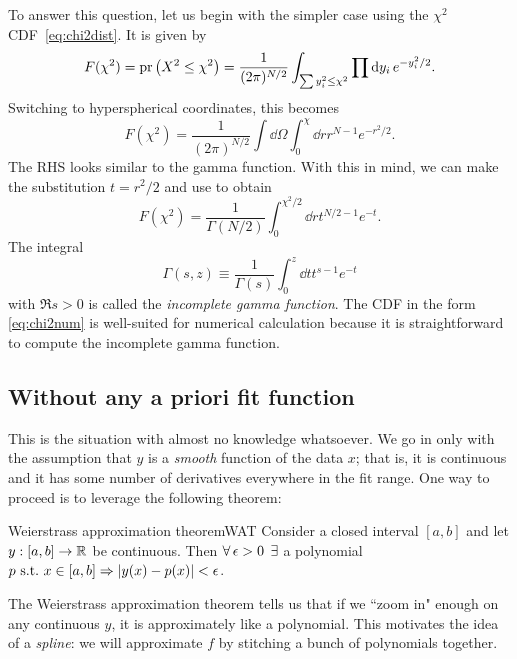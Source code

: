 To answer this question, let us begin with the simpler case using
the $\chi^2$ CDF~\eqref{eq:chi2dist}. It is given by
\begin{equation}
  F(\chi^2)=\pr{X^2\le\chi^2}
           =\frac{1}{(2\pi)^{N/2}}\int_{\sum y_i^2\le\chi^2}
            \prod\dd{y_i}e^{-y_i^2/2}.
\end{equation}
Switching to hyperspherical coordinates, this becomes
\begin{equation}
  F(\chi^2)=\frac{1}{(2\pi)^{N/2}}
              \int\dd{\Omega}\int_0^\chi\dd{r}r^{N-1}e^{-r^2/2}.
\end{equation}
The RHS looks similar to the gamma function. With this in mind,
we can make the substitution $t=r^2/2$ and use 
to obtain
\begin{equation}\label{eq:chi2num}
  F(\chi^2)=\frac{1}{\Gamma(N/2)}\int_0^{\chi^2/2}\dd{r}t^{N/2-1}e^{-t}.
\end{equation}
  The integral
  \begin{equation}
    \Gamma(s,z)\equiv\frac{1}{\Gamma(s)}\int_0^z\dd{t}t^{s-1}e^{-t}
  \end{equation}
  with $\Re s>0$ is called the {\it incomplete gamma function}.
The CDF in the form \eqref{eq:chi2num} is well-suited for numerical
calculation because it is straightforward to compute the incomplete
gamma function.


\subsection{Without any a priori fit function}


This is the situation with almost no knowledge whatsoever. We go in only with
the assumption that $y$ is a {\it smooth} 
function of the data $x$; that is, it is continuous and
it has some number of derivatives everywhere in the fit range.
One way to proceed is to leverage the following theorem:
\begin{theorem}{Weierstrass approximation theorem}{WAT}
Consider a closed interval $[a,b]$ and let $y:[a,b]\to\mathbb{R}$
be continuous. Then $\operatorname{\forall}\epsilon>0$ $\operatorname{\exists}$ a polynomial 
$p~\text{s.t.}~ x\in[a,b]\Rightarrow |y(x)-p(x)|<\epsilon$.
\end{theorem}
The Weierstrass approximation theorem
tells us that if we ``zoom in" enough on any continuous $y$, it is approximately
like a polynomial. This motivates the idea of a {\it spline}: we
will approximate $f$ by stitching a bunch of polynomials together.

